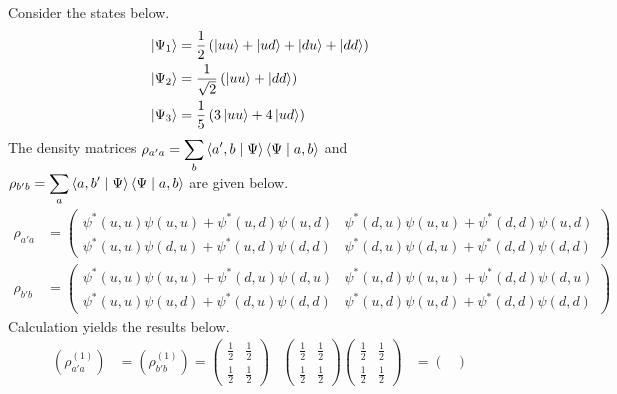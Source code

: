 \begin{answer}
	Consider the states below.
	\begin{align*}
		\ket{\Psi_1} & = \frac{1}{2} \left(\ket{u u} + \ket{u d} + \ket{d u} + \ket{d d}\right) \\
		\ket{\Psi_2} & = \frac{1}{\sqrt{2}} \left(\ket{u u} + \ket{d d}\right)                  \\
		\ket{\Psi_3} & = \frac{1}{5} \left(3 \ket{u u} + 4 \ket{u d}\right)
	\end{align*}
	The density matrices $\displaystyle \rho_{a' a} = \sum_b \braket{a',b \mid \Psi} \braket{\Psi \mid a,b}$ and $\displaystyle \rho_{b' b} = \sum_a \braket{a,b' \mid \Psi} \braket{\Psi \mid a,b}$ are given below.
	\begin{align*}
		\rho_{a' a} & =
		\begin{pmatrix}
			\psi^*(u, u) \psi(u, u) + \psi^*(u, d) \psi(u, d) &
			\psi^*(d, u) \psi(u, u) + \psi^*(d, d) \psi(u, d)   \\
			\psi^*(u, u) \psi(d, u) + \psi^*(u, d) \psi(d, d) &
			\psi^*(d, u) \psi(d, u) + \psi^*(d, d) \psi(d, d)
		\end{pmatrix}
		\\ \rho_{b' b} &=
		\begin{pmatrix}
			\psi^*(u, u) \psi(u, u) + \psi^*(d, u) \psi(d, u) &
			\psi^*(u, d) \psi(u, u) + \psi^*(d, d) \psi(d, u)   \\
			\psi^*(u, u) \psi(u, d) + \psi^*(d, u) \psi(d, d) &
			\psi^*(u, d) \psi(u, d) + \psi^*(d, d) \psi(d, d)
		\end{pmatrix}
	\end{align*}
	Calculation yields the results below.
	\begin{align*}
		\left(\rho^{(1)}_{a' a}\right) & =
		\left(\rho^{(1)}_{b' b}\right) =
		\begin{pmatrix}
			\frac{1}{2} & \frac{1}{2} \\
			\frac{1}{2} & \frac{1}{2}
		\end{pmatrix}
		                               &
		\begin{pmatrix}
			\frac{1}{2} & \frac{1}{2} \\
			\frac{1}{2} & \frac{1}{2}
		\end{pmatrix}
		\begin{pmatrix}
			\frac{1}{2} & \frac{1}{2} \\
			\frac{1}{2} & \frac{1}{2}
		\end{pmatrix}
		                               & =
		\begin{pmatrix}

\end{pmatrix}
\end{align*}
\end{answer}

